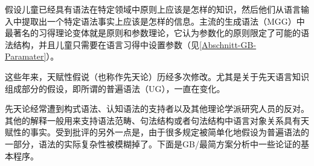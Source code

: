  \citet[]{Chomsky65a}假设儿童已经具有语法在特定领域中原则上应该是怎样的知识，然后他们从语言输入中提取出一个特定语法事实上应该是怎样的信息。主流的生成语法（MGG）中最著名的习得理论变体就是原则和参数理论，它认为参数化的原则限定了可能的语法结构，并且儿童只需要在语言习得中设置参数（见\ref{Abschnitt-GB-Paramater}）。

这些年来，天赋性假说（也称作先天论）历经多次修改。尤其是关于先天语言知识组成部分的假设，即所谓的普遍语法（UG），一直在变化。

先天论经常遭到构式语法\indexcxgc、认知语法的支持者以及其他理论学派研究人员的反对。其他的解释一般用来支持语法范畴、句法结构或者句法结构中语言对象关系具有天赋性的事实。受到批评的另外一点是，由于很多规定被简单化地假设为普遍语法的一部分，语法的实际复杂性被模糊掉了。下面是GB/最简方案分析中一些论证的基本程序。

